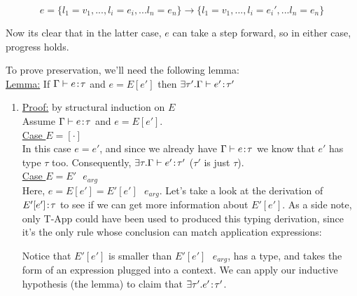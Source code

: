 \documentclass[10pt]{article}
\begin{document}
\begin{exercise}
\begin{enumerate}[\hspace{20pt}]
$$e= \{l_1 = v_1, ... , l_i = e_i, ... l_n = e_n \} \rightarrow \{l_1 = v_1, ... , 
l_i = e_i', ... l_n = e_n \}$$

Now its clear that in the latter case, $e$ can take a step forward, so in either 
case, progress holds. 
\checkmark \checkmark
\end{enumerate}

\noindent To prove preservation, we'll need the following lemma: \\

\noindent \underline{Lemma:} If $\Gamma \vdash e\ty\tau$ and $e = E[e']$ then $\exists \tau'. 
\Gamma \vdash e' \ty \tau'$ \\

\begin{enumerate}[\hspace{20pt}]
	\item
	\underline{Proof:} by structural induction on $E$ \\
	
	Assume $\Gamma \vdash e \ty \tau$ and $e = E[e']$. \\
	
	\underline{Case $E = [\cdot]$} \\
	In this case $e = e'$, and since we already have $\Gamma \vdash e \ty \tau$ we 
	know that $e'$ has type $\tau$ too. Consequently, $\exists \tau. \Gamma \vdash
	e' \ty \tau'$ ($\tau'$ is just $\tau$). \checkmark \\
	
	\underline{Case $E = E'\text{ } e_{arg}$} \\
	Here, $e = E[e'] = E'[e'] \text{ } e_{arg}$. Let's take a look at the derivation
	of $E'[e'] \ty \tau$ to see if we can get more information about $E'[e']$. As a
	side note, only T-App could have been used to produced this typing derivation,
	since it's the only rule whose conclusion can match application expressions:
	
	\begin{prooftree}
	\end{prooftree}
	
	Notice that $E'[e']$ is smaller than $E'[e'] \text{ } e_{arg}$, has a type, and 
	takes the form of an expression plugged into a context. We can 
	apply our inductive hypothesis (the lemma) to claim that $\exists \tau'. e' \ty 	\tau'$. \checkmark \\
	

\end{enumerate}
\end{exercise}
\end{document}
